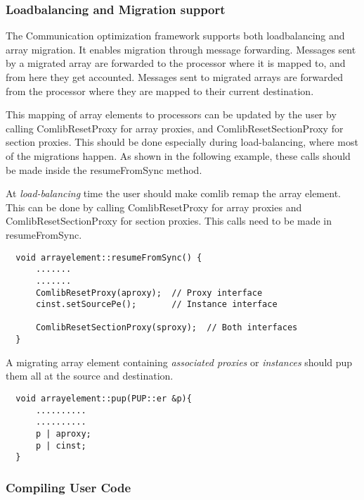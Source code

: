 \subsubsection{Loadbalancing and Migration support}

The Communication optimization framework supports both loadbalancing and array
migration. It enables migration through message forwarding. Messages sent by a
migrated array are forwarded to the processor where it is mapped to, and from
here they get accounted. Messages sent to migrated arrays are forwarded from the
processor where they are mapped to their current destination.

This mapping of array elements to processors can be updated by the user by
calling {\textrm{ComlibResetProxy}} for array proxies, and
{\textrm{ComlibResetSectionProxy}} for section proxies. This should be done
especially during load-balancing, where most of the migrations happen. As shown
in the following example, these calls should be made inside the
{\textrm{resumeFromSync}} method.

At {\em load-balancing} time the user should make comlib remap the array
element. This can be done by calling ComlibResetProxy for array proxies and
ComlibResetSectionProxy for section proxies. This calls need to be made in
resumeFromSync.

\begin{verbatim}
  void arrayelement::resumeFromSync() {
      .......
      .......
      ComlibResetProxy(aproxy);  // Proxy interface
      cinst.setSourcePe();       // Instance interface

      ComlibResetSectionProxy(sproxy);  // Both interfaces
  }
\end{verbatim}

A migrating array element containing {\em associated proxies} or {\em
instances} should pup them all at the source and destination.

\begin{verbatim}
  void arrayelement::pup(PUP::er &p){
      ..........
      ..........
      p | aproxy;
      p | cinst;
  }
\end{verbatim}

\subsubsection{Compiling User Code}


